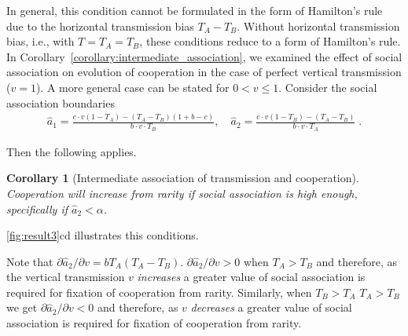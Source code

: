 \documentclass[12pt]{extarticle}
\newtheorem{corollary}{Corollary}
\begin{document}
{In general, this condition cannot be formulated in the form of Hamilton's rule due to the horizontal transmission bias $T_A-T_B$.
Without horizontal transmission bias, i.e., with $T=T_A=T_B$, these conditions reduce to a form of Hamilton's rule.
\\

In Corollary~\autoref{corollary:intermediate_association}, we examined the effect of social association on evolution of cooperation in the case of perfect vertical transmission ($v=1$).
A more general case can be stated for $0 < v \leq 1$.
Consider the social association boundaries 
\begin{equation}\begin{aligned}\label{eq:boundries_assortative_meeting_general_case}
  \hat{a}_1 = \frac{c\cdot v(1-T_A) -(T_A-T_B)(1+b-c)}{b\cdot v \cdot T_B}, \quad
  \hat{a}_2 = \frac{c\cdot v(1-T_B)-(T_A-T_B)}{b\cdot v\cdot T_A} \;.
\end{aligned}\end{equation}

Then the following applies.
\\

\begin{corollary}[Intermediate association of transmission and cooperation]
\label{corollary:intermediate_association_res3}
Cooperation will increase from rarity if social association is high enough, specifically if $\hat a_2 < \alpha$.
\end{corollary}
\autoref{fig:result3}cd illustrates this conditions.

Note that $\partial \hat a_2 / \partial v = b T_A (T_A-T_B)$. $\partial \hat a_2 / \partial v > 0$ when $T_A > T_B$ and therefore, as the vertical transmission $v$ \emph{increases} a greater value of social association is required for fixation of cooperation from rarity. %
Similarly, when $T_B>T_A$ $T_A > T_B$ we get $\partial \hat a_2 / \partial v < 0$ and therefore, as $v$ \emph{decreases} a greater value of social association is required for fixation of cooperation from rarity.
\\

}
\end{document}
